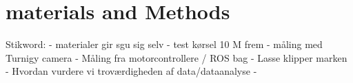 \section{materials and Methods}

Stikword:
	- materialer gir sgu sig selv
	- test kørsel 10 M frem
	- måling med Turnigy camera
	- Måling fra motorcontrollere / ROS bag
	- Lasse klipper marken
	- Hvordan vurdere vi troværdigheden af data/dataanalyse
	-  
